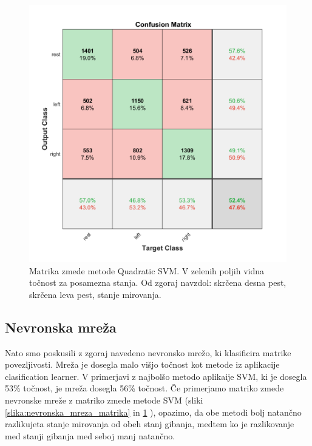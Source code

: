 \begin{figure}
    \begin{center}
    \includegraphics[width=0.8\linewidth]{slike/Confusion_13-20Hz_0s-4s.png}
    \end{center}
    \caption{Matrika zmede metode Quadratic SVM. V zelenih poljih vidna točnost za posamezna stanja. Od zgoraj navzdol: skrčena desna pest, skrčena leva pest, stanje mirovanja.}
    \label{slika:SVM_matrika}
    \end{figure}

\subsection{Nevronska mreža}
Nato smo poskusili z zgoraj navedeno nevronsko mrežo, ki klasificira matrike povezljivosti. Mreža je dosegla malo višjo točnost kot metode iz aplikacije clasification learner. V primerjavi z najbolšo metodo aplikaije SVM, ki je dosegla 53\% točnost, je mreža dosegla 56\% točnost. Če primerjamo matriko zmede nevronske mreže z matriko zmede metode SVM (sliki \ref{slika:nevronska_mreza_matrika} in \ref{slika:SVM_matrika} ), opazimo, da obe metodi bolj natančno razlikujeta stanje mirovanja od obeh stanj gibanja, medtem ko je razlikovanje med stanji gibanja med seboj manj natančno.

